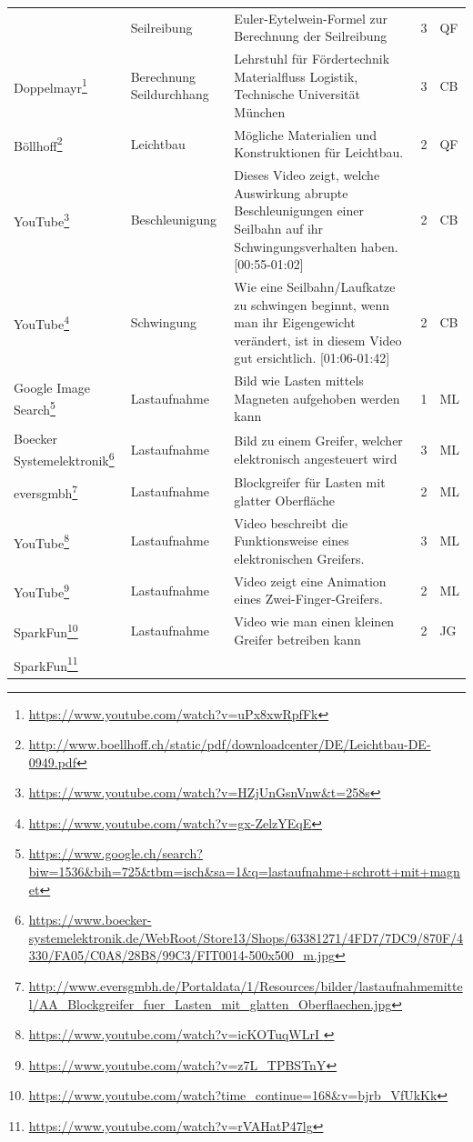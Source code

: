 \documentclass[a4paper,11pt]{scrartcl}
\begin{document}
\begin{landscape}
{\begin{longtable}{|p{4cm}|p{4cm}|p{12cm}|l|l|}
& Seilreibung
& Euler-Eytelwein-Formel zur Berechnung der Seilreibung
& 3 
& QF \\
Doppelmayr\footnote{\url{https://www.youtube.com/watch?v=uPx8xwRpfFk}}
& Berechnung Seildurchhang
& Lehrstuhl für Fördertechnik Materialfluss Logistik, Technische Universität München
& 3 
& CB \\
Böllhoff\footnote{\url{http://www.boellhoff.ch/static/pdf/downloadcenter/DE/Leichtbau-DE-0949.pdf}}
& Leichtbau
& Mögliche Materialien und Konstruktionen für Leichtbau.
& 2 
& QF \\
YouTube\footnote{\url{https://www.youtube.com/watch?v=HZjUnGsnVnw&t=258s}}
& Beschleunigung
& Dieses Video zeigt, welche Auswirkung abrupte Beschleunigungen einer Seilbahn auf ihr Schwingungsverhalten haben. [00:55-01:02]
& 2 
& CB \\
YouTube\footnote{\url{https://www.youtube.com/watch?v=gx-ZelzYEqE}}
& Schwingung
& Wie eine Seilbahn/Laufkatze zu schwingen beginnt, wenn man ihr Eigengewicht verändert, ist in diesem Video gut ersichtlich. [01:06-01:42]
& 2 
& CB \\
Google Image Search\footnote{\url{https://www.google.ch/search?biw=1536&bih=725&tbm=isch&sa=1&q=lastaufnahme+schrott+mit+magnet}}
& Lastaufnahme
& Bild wie Lasten mittels Magneten aufgehoben werden kann
& 1 
& ML \\
Boecker Systemelektronik\footnote{\url{https://www.boecker-systemelektronik.de/WebRoot/Store13/Shops/63381271/4FD7/7DC9/870F/4330/FA05/C0A8/28B8/99C3/FIT0014-500x500_m.jpg}}
& Lastaufnahme
& Bild zu einem Greifer, welcher elektronisch angesteuert wird
& 3 
& ML \\
eversgmbh\footnote{\url{http://www.eversgmbh.de/Portaldata/1/Resources/bilder/lastaufnahmemittel/AA_Blockgreifer_fuer_Lasten_mit_glatten_Oberflaechen.jpg}}
& Lastaufnahme
& Blockgreifer für Lasten mit glatter Oberfläche
& 2 
& ML \\
YouTube\footnote{\url{https://www.youtube.com/watch?v=icKOTuqWLrI  }}
& Lastaufnahme
& Video beschreibt die Funktionsweise eines elektronischen Greifers.
& 3 
& ML \\
YouTube\footnote{\url{https://www.youtube.com/watch?v=z7L_TPBSTnY}}
& Lastaufnahme
& Video zeigt eine Animation eines Zwei-Finger-Greifers.
& 2 
& ML \\
SparkFun\footnote{\url{https://www.youtube.com/watch?time_continue=168&v=bjrb_VfUkKk}}
& Lastaufnahme
& Video wie man einen kleinen Greifer betreiben kann
& 2 
& JG \\
SparkFun\footnote{\url{https://www.youtube.com/watch?v=rVAHatP47lg}}

\end{longtable}}
\end{landscape}
\end{document}
